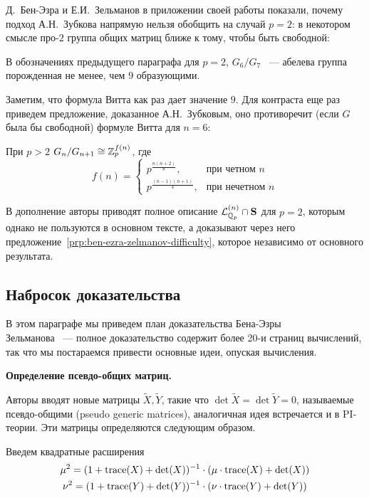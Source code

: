 Д.\ Бен-Эзра и Е.И.\ Зельманов в приложении своей работы показали, почему подход А.Н.\ Зубкова напрямую нельзя обобщить на случай $p=2$: в некотором смысле про-$2$ группа общих матриц ближе к тому, чтобы быть свободной:
\begin{proposition}
    \label{prp:ben-ezra-zelmanov-difficulty}
    В обозначениях предыдущего параграфа для $p=2$, $G_6 / G_7$ ~--- абелева группа порожденная не менее, чем $9$ образующими.
\end{proposition}
Заметим, что формула Витта как раз дает значение $9$.
Для контраста еще раз приведем предложение, доказанное А.Н.\ Зубковым, оно противоречит (если $G$ была бы свободной) формуле Витта для $n=6$:
\begin{proposition}
    При $p>2$ $G_n / G_{n+1} \cong \mathbb{Z}_p^{f(n)}$, где\\
    \[
        f(n) =
        \begin{cases}
            p^{\frac{n(n+2)}{8}}, & \text{при четном $n$} \\
            p^{\frac{(n-1)(n+1)}{4}}, & \text{при нечетном $n$}
        \end{cases}
    \]
\end{proposition}

В дополнение авторы приводят полное описание $\mathcal{L}^{(n)}_{\mathbb{Q}_p} \cap \mathbf{S}$ для $p=2$, которым однако не пользуются в основном тексте, а доказывают через него предложение~\ref{prp:ben-ezra-zelmanov-difficulty}, которое независимо от основного результата.

\subsection{Набросок доказательства}\label{subsec:ben-ezra-zelmanov-non-injective}
В этом параграфе мы приведем план доказательства Бена-Эзры\textemdash \\Зельманова ~--- полное доказательство содержит более 20-и страниц вычислений, так что мы постараемся привести основные идеи, опуская вычисления.

\vskip 0.1in\noindent
{\large\textbf{Определение псевдо-общих матриц.}}

Авторы вводят новые матрицы $\tilde{X}, \tilde{Y}$, такие что $\det \tilde{X} = \det \tilde{Y} = 0$, называемые псевдо-общими (pseudo generic matrices), аналогичная идея встречается и в PI-теории.
Эти матрицы определяются следующим образом.

Введем квадратные расширения
\begin{gather*}
    \mu^2 = (1 + \mathrm{trace}(X) + \det(X))^{-1} \cdot (\mu \cdot \mathrm{trace}(X) + \det(X))\\
    \nu^2 = (1 + \mathrm{trace}(Y) + \det(Y))^{-1} \cdot (\nu \cdot \mathrm{trace}(Y) + \det(Y))
\end{gather*}

